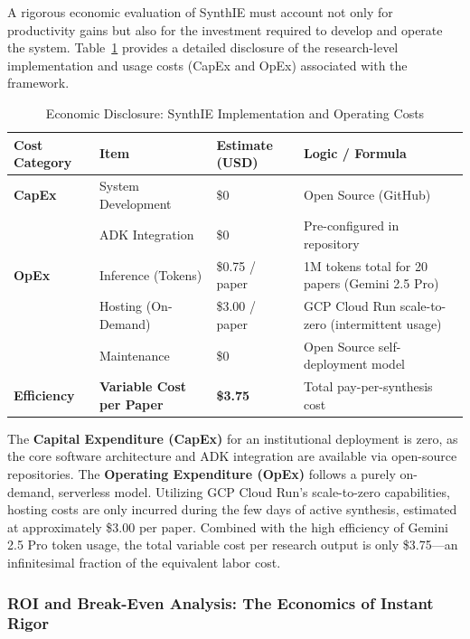 \documentclass[12pt,a4paper]{article}
\begin{document}
A rigorous economic evaluation of SynthIE must account not only for productivity gains but also for the investment required to develop and operate the system. Table~\ref{tab:costs} provides a detailed disclosure of the research-level implementation and usage costs (CapEx and OpEx) associated with the framework.

\begin{table}[h]
\centering
\caption{Economic Disclosure: SynthIE Implementation and Operating Costs}
\label{tab:costs}
\small
\begin{tabular}{@{}p{2.5cm}p{3.5cm}p{2.5cm}p{6cm}@{}}
\toprule
\textbf{Cost Category} & \textbf{Item} & \textbf{Estimate (USD)} & \textbf{Logic / Formula} \\ \midrule
\textbf{CapEx} & System Development & \$0 & Open Source (GitHub) \\
 & ADK Integration & \$0 & Pre-configured in repository \\ \addlinespace
\textbf{OpEx} & Inference (Tokens) & \$0.75 / paper & 1M tokens total for 20 papers (Gemini 2.5 Pro) \\
 & Hosting (On-Demand) & \$3.00 / paper & GCP Cloud Run scale-to-zero (intermittent usage) \\
 & Maintenance & \$0 & Open Source self-deployment model \\ \midrule
\textbf{Efficiency} & \textbf{Variable Cost per Paper} & \textbf{\$3.75} & Total pay-per-synthesis cost \\ \bottomrule
\end{tabular}
\end{table}

The \textbf{Capital Expenditure (CapEx)} for an institutional deployment is zero, as the core software architecture and ADK integration are available via open-source repositories. The \textbf{Operating Expenditure (OpEx)} follows a purely on-demand, serverless model. Utilizing GCP Cloud Run's scale-to-zero capabilities, hosting costs are only incurred during the few days of active synthesis, estimated at approximately \$3.00 per paper. Combined with the high efficiency of Gemini 2.5 Pro token usage, the total variable cost per research output is only \$3.75—an infinitesimal fraction of the equivalent labor cost.

\subsubsection{ROI and Break-Even Analysis: The Economics of Instant Rigor}
\end{document}
